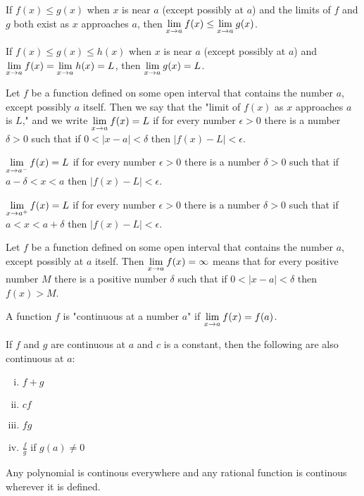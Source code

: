 \documentclass[a4paper,11pt]{article}
\begin{document}
\begin{outline}
    If \(f(x) \leq g(x)\) when \(x\) is near \(a\) (except possibly at \(a\)) and the limits of
    \(f\) and \(g\) both exist as \(x\) approaches \(a\), then \(\xlimit{x}{a} f(x) \leq \xlimit{x}{a} g(x)\).
    
    If \(f(x) \leq g(x) \leq h(x)\) when \(x\) is near \(a\) (except possibly at \(a\)) and \(\xlimit{x}{a}f(x) =
    \xlimit{x}{a}h(x) = L\), then \(\xlimit{x}{a} g(x) = L\).
    
    Let \(f\) be a function defined on some open interval that contains the number \(a\), except possibly \(a\)
    itself. Then we say that the "limit of \(f(x)\) as \(x\) approaches \(a\) is \(L\)," and we write 
    \(\xlimit{x}{a} f(x) = L\) if for every number \(\epsilon > 0\) there is a number \(\delta > 0\) such that
    if \(0 < |x - a| < \delta\) then \(|f(x)-L| < \epsilon\).
    
    \(\xlimit[-]{x}{a} f(x) = L\) if for every number \(\epsilon > 0\) there is a number \(\delta > 0\)
    such that if \(a - \delta < x < a\) then \(|f(x)-L| < \epsilon\).
    
    \(\xlimit[+]{x}{a} f(x) = L\) if for every number \(\epsilon > 0\) there is a number \(\delta > 0\) such
    that if \(a < x < a + \delta\) then \(|f(x)-L| < \epsilon\).
    
    Let \(f\) be a function defined on some open interval that contains the number \(a\), except possibly at
    \(a\) itself. Then \(\xlimit{x}{a} f(x) = \infty\) means that for every positive number \(M\) there is a
    positive number \(\delta\) such that if \(0 < |x-a| < \delta\) then \(f(x) > M\).
    
    A function \(f\) is "continuous at a number \(a\)" if \(\xlimit{x}{a} f(x) = f(a)\).
    
    If \(f\) and \(g\) are continuous at \(a\) and \(c\) is a constant, then the following are also 
    continuous at \(a\):
    \begin{enumerate}[i.]
      \item \(f + g\)
      \item \(cf\)
      \item \(fg\)
      \item \(\frac{f}{g}\) if \(g(a) \neq 0\)
    \end{enumerate}

    Any polynomial is continous everywhere and any rational function is continous wherever it is defined.
    

\end{outline}
\end{document}
